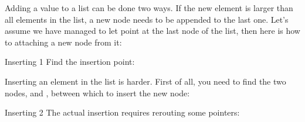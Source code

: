 Adding a value to a list can be done two ways. If the new element is
larger than all elements in the list, a new node needs to be appended
to the last one. Let's assume we have managed
to let  point at the last node of the list,
then here is how to 
attaching a new node from it:
%

\begin{block}{Inserting 1}
  \label{sl:flink5}
  Find the insertion point:
\end{block}

Inserting an element in the list is harder.
First of all, you need to find the two nodes,
 and , between which to insert the new node:
%

\begin{block}{Inserting 2}
  \label{sl:flink6}
  The actual insertion requires rerouting some pointers:
\end{block}


